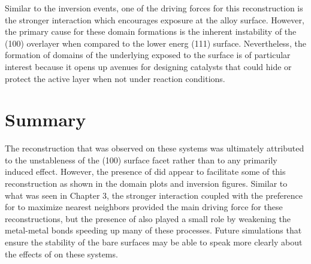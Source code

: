 Similar to the inversion events, one of the driving forces for this
reconstruction is the stronger  interaction which encourages
 exposure at the alloy surface. However, the primary cause for these
domain formations is the inherent instability of the (100) overlayer when
compared to the lower energ (111) surface. Nevertheless, the formation of
domains of the underlying  exposed to the surface is of particular
interest because it opens up avenues for designing catalysts that could hide or
protect the active layer when not under reaction conditions.

\section{Summary}
The reconstruction that was observed on these systems was ultimately attributed
to the unstableness of the (100) surface facet rather than to any primarily
 induced effect. However, the presence of  did appear to
facilitate some of this reconstruction as shown in the domain plots and
inversion figures. Similar to what was seen in Chapter 3, the stronger
 interaction coupled with the preference for  to
maximize nearest neighbors provided the main driving force for these
reconstructions, but the presence of  also played a small role by
weakening the metal-metal bonds speeding up many of these processes. Future
simulations that ensure the stability of the bare surfaces may be able to speak
more clearly about the effects of  on these systems.

